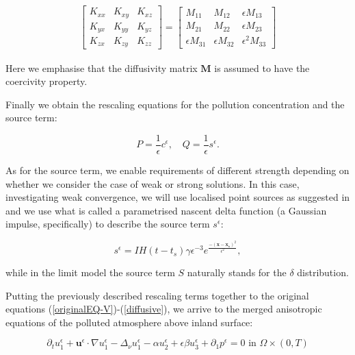 \documentclass[11pt]{article}
\begin{document}
\begin{gather}
 \begin{bmatrix} K_{xx} & K_{xy} & K_{xz} \\ K_{yx} & K_{yy} & K_{yz} \\ K_{zx} & K_{zy} & K_{zz} \end{bmatrix}
 =
  \begin{bmatrix}
    M_{11} & M_{12} & \epsilon M_{13} \\ M_{21} & M_{22} & \epsilon M_{23} \\ \epsilon M_{31} & \epsilon M_{32} & \epsilon^2 M_{33}
  \end{bmatrix}
\end{gather}

Here we emphasise that the diffusivity matrix $\mathbf{M}$ is assumed to have the coercivity property.

Finally we obtain the rescaling equations for the pollution concentration and the source term:

    \[ P = \frac{1}{\epsilon} c^\epsilon, \quad Q = \frac{1}{\epsilon} s^\epsilon. \]
    
As for the source term, we enable requirements of different strength depending on whether we consider the case of weak or strong solutions. In this case, investigating weak convergence, we will use localised point sources as suggested in \cite{zhuk2016source} and we use what is called a parametrised nascent delta function (a Gaussian impulse, specifically) to describe the source term $s^\epsilon$:

\begin{equation} \label{sourcedefinition}
  s^\epsilon = I H(t-t_s) \gamma \epsilon^{-3} e ^ {\frac{-(\mathbf{x}-\mathbf{x_s})^2}{\epsilon^2}},
\end{equation}

while in the limit model the source term $S$ naturally stands for the $\delta$ distribution.
    
Putting the previously described rescaling terms together to the original equations (\ref{originalEQ-V})-(\ref{diffusive}), we arrive to the merged anisotropic equations of the polluted atmosphere above inland surface:
  
    \begin{equation} \label{ANSC1}
    \partial_t u^\epsilon _1 + \mathbf{u}^\epsilon \cdot \nabla u^\epsilon _1 -\Delta_\nu u^\epsilon _1 -\alpha u_2^\epsilon + \epsilon \beta u_3^\epsilon + \partial_1 p^\epsilon = 0 \text{ in } \Omega \times (0,T)
    \end{equation}
    
\end{document}
